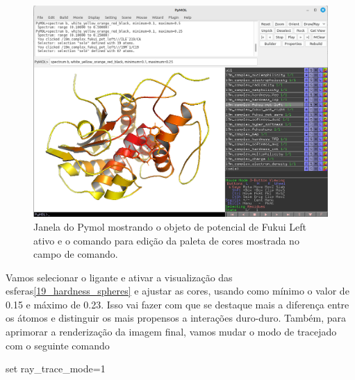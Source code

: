 \documentclass[a4paper,11pt]{refart}
\begin{document}
	\hspace*{-\leftmarginwidth}
	\begin{minipage}{\fullwidth}
		\begin{figure}[H]
			\begin{center}
				\includegraphics[width=5in]{19m_hardness_window}
				\caption{Janela do Pymol mostrando o objeto de potencial de Fukui Left ativo e o comando para edição da paleta de cores mostrada no campo de comando.}
				\label{19_hardness_w}
			\end{center}
		\end{figure}
	\end{minipage}

	Vamos selecionar o ligante e ativar a visualização das esferas\autoref{19_hardness_spheres} e ajustar as cores, usando como mínimo o valor de 0.15 e máximo de 0.23. Isso vai fazer com que se destaque mais a diferença entre os átomos e distinguir os mais propensos a interações duro-duro. Também, para aprimorar a renderização da imagem final, vamos mudar o modo de tracejado com o seguinte comando 
	
	\hspace*{-\leftmarginwidth}
	\begin{minipage}{\fullwidth}
		\begin{pymol}set ray_trace_mode=1\end{pymol}
	\end{minipage}
	
\end{document}
